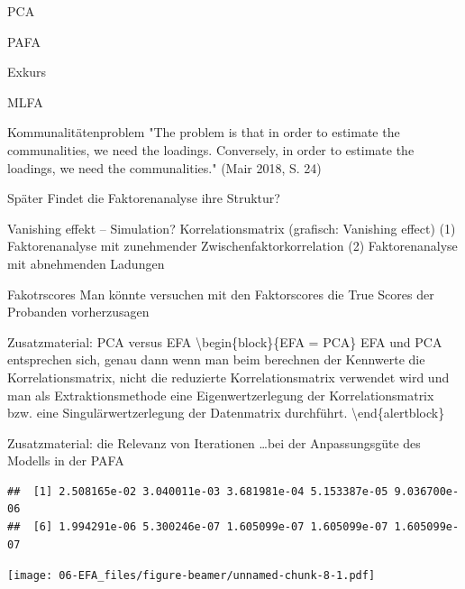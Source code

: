 \documentclass[
  ignorenonframetext,
]{beamer}
\begin{document}
\begin{frame}{PCA}
\protect\hypertarget{pca}{}
\end{frame}

\begin{frame}{PAFA}
\protect\hypertarget{pafa}{}
\end{frame}

\begin{frame}{Exkurs}
\protect\hypertarget{exkurs}{}
\end{frame}

\begin{frame}{MLFA}
\protect\hypertarget{mlfa}{}
\begin{alertblock}{Kommunalitätenproblem}
  "The problem is that in order to estimate the communalities, we need the
  loadings. Conversely, in order to estimate the loadings, we need the
  communalities." (Mair 2018, S. 24)
\end{alertblock}
\end{frame}

\begin{frame}{Später}
\protect\hypertarget{spuxe4ter}{}
Findet die Faktorenanalyse ihre Struktur?

Vanishing effekt -- Simulation? Korrelationsmatrix (grafisch: Vanishing
effect) (1) Faktorenanalyse mit zunehmender Zwischenfaktorkorrelation
(2) Faktorenanalyse mit abnehmenden Ladungen
\end{frame}

\begin{frame}{Fakotrscores}
\protect\hypertarget{fakotrscores}{}
Man könnte versuchen mit den Faktorscores die True Scores der Probanden
vorherzusagen
\end{frame}

\begin{frame}{Zusatzmaterial: PCA versus EFA}
\protect\hypertarget{zusatzmaterial-pca-versus-efa}{}
\textbackslash begin\{block\}\{EFA = PCA\} EFA und PCA entsprechen sich,
genau dann wenn man beim berechnen der Kennwerte die Korrelationsmatrix,
nicht die reduzierte Korrelationsmatrix verwendet wird und man als
Extraktionsmethode eine Eigenwertzerlegung der Korrelationsmatrix bzw.
eine Singulärwertzerlegung der Datenmatrix durchführt.
\textbackslash end\{alertblock\}
\end{frame}

\begin{frame}[fragile]{Zusatzmaterial: die Relevanz von Iterationen}
\protect\hypertarget{zusatzmaterial-die-relevanz-von-iterationen}{}
\ldots bei der Anpassungsgüte des Modells in der PAFA

\begin{verbatim}
##  [1] 2.508165e-02 3.040011e-03 3.681981e-04 5.153387e-05 9.036700e-06
##  [6] 1.994291e-06 5.300246e-07 1.605099e-07 1.605099e-07 1.605099e-07
\end{verbatim}

\texttt{[image: 06-EFA\_files/figure-beamer/unnamed-chunk-8-1.pdf]}
\end{frame}
\end{document}

